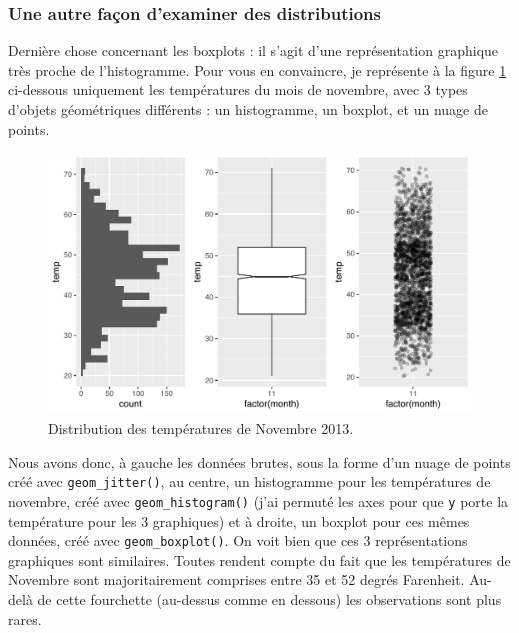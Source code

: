 \documentclass[
  a4paper,
]{article}
\begin{document}
\hypertarget{une-autre-fauxe7on-dexaminer-des-distributions}{%
\subsubsection{Une autre façon d'examiner des distributions}\label{une-autre-fauxe7on-dexaminer-des-distributions}}

Dernière chose concernant les boxplots : il s'agit d'une représentation graphique très proche de l'histogramme. Pour vous en convaincre, je représente à la figure \ref{fig:compboxplot} ci-dessous uniquement les températures du mois de novembre, avec 3 types d'objets géométriques différents : un histogramme, un boxplot, et un nuage de points.

\begin{figure}[htpb]

{\centering \includegraphics[width=0.9\linewidth]{figure/compboxplot-1} 

}

\caption{Distribution des températures de Novembre 2013.}\label{fig:compboxplot}
\end{figure}

Nous avons donc, à gauche les données brutes, sous la forme d'un nuage de points créé avec \texttt{geom\_jitter()}, au centre, un histogramme pour les températures de novembre, créé avec \texttt{geom\_histogram()} (j'ai permuté les axes pour que \texttt{y} porte la température pour les 3 graphiques) et à droite, un boxplot pour ces mêmes données, créé avec \texttt{geom\_boxplot()}. On voit bien que ces 3 représentations graphiques sont similaires. Toutes rendent compte du fait que les températures de Novembre sont majoritairement comprises entre 35 et 52 degrés Farenheit. Au-delà de cette fourchette (au-dessus comme en dessous) les observations sont plus rares.
\end{document}
